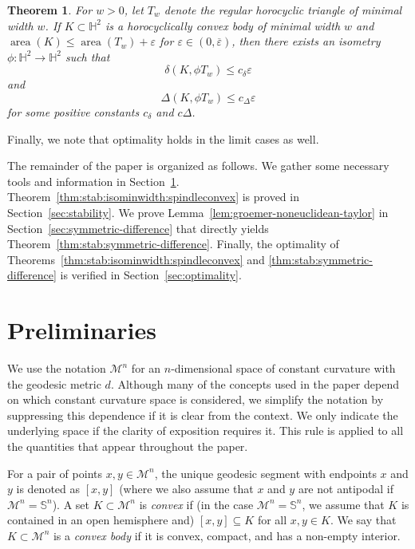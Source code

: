 \documentclass[12pt,reqno]{amsart}
\newtheorem{theorem}{Theorem}[section]
\theoremstyle{remark}
\newcommand{\hyp}{{\mathbb H}}
\newcommand{\sph}{{\mathbb S}}
\newcommand{\M}{\mathcal{M}}
\DeclareMathOperator{\area}{\mathrm{area}}
\begin{document}
\begin{theorem}\label{thm:hyperbolic-limit-cases}
For $w>0$, let $T_w$ denote the regular horocyclic triangle of minimal width $w$. If $K\subset\hyp^2$ is a horocyclically convex body of minimal width $w$ and $\area(K)\leq \area(T_w)+\varepsilon$ for $\varepsilon\in(0,\overline{\varepsilon})$, then there exists an isometry $\phi\colon\hyp^2\to\hyp^2$ such that
$$
\delta(K,\phi T_w)\leq c_\delta\varepsilon
$$
and
$$
\Delta(K,\phi T_w)\leq c_\Delta\varepsilon
$$
for some positive constants $c_\delta$ and $c\Delta$.
\end{theorem}

Finally, we note that optimality holds in the limit cases as well.


The remainder of the paper is organized as follows. We gather some necessary tools and information in Section~\ref{sec:preliminaries}. Theorem~\ref{thm:stab:isominwidth:spindleconvex} is proved in Section~\ref{sec:stability}.  We prove Lemma~\ref{lem:groemer-noneuclidean-taylor} in Section~\ref{sec:symmetric-difference} that directly yields Theorem~\ref{thm:stab:symmetric-difference}. Finally, the optimality of Theorems~\ref{thm:stab:isominwidth:spindleconvex} and \ref{thm:stab:symmetric-difference} is verified in Section~\ref{sec:optimality}.

\section{Preliminaries}\label{sec:preliminaries}

We use the notation $\M^n$ for an $n$-dimensional space of constant curvature with the geodesic metric $d$. Although many of the concepts used in the paper depend on which constant curvature space is considered, we simplify the notation by suppressing this dependence if it is clear from the context. We only indicate the underlying space if the clarity of exposition requires it. This rule is applied to all the quantities that appear throughout the paper. 



For a pair of points $x,y\in\M^n$, the unique geodesic segment with endpoints $x$ and $y$ is denoted as $[x,y]$ (where we also assume that $x$ and $y$ are not antipodal if $\M^n=\sph^n$). A set $K\subset\M^n$ is \emph{convex} if (in the case $\M^n=\sph^n$, we assume that $K$ is contained in an open hemisphere and) $[x,y]\subseteq K$ for all $x,y\in K$. We say that $K\subset\M^n$ is a \emph{convex body} if it is convex, compact, and has a non-empty interior.
\end{document}
